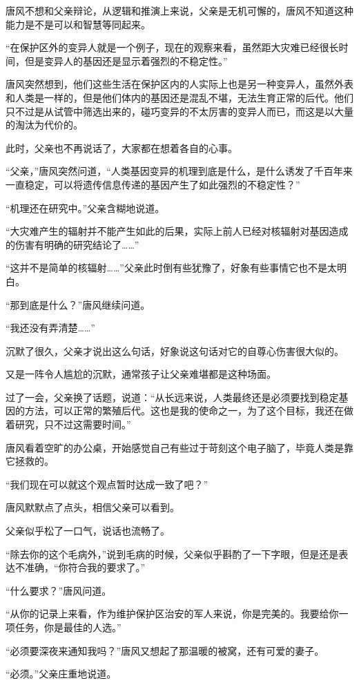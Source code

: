 唐风不想和父亲辩论，从逻辑和推演上来说，父亲是无机可懈的，唐风不知道这种能力是不是可以和智慧等同起来。

“在保护区外的变异人就是一个例子，现在的观察来看，虽然距大灾难已经很长时间，但是变异人的基因还是显示着强烈的不稳定性。”

唐风突然想到，他们这些生活在保护区内的人实际上也是另一种变异人，虽然外表和人类是一样的，但是他们体内的基因还是混乱不堪，无法生育正常的后代。他们只不过是从试管中筛选出来的，碰巧变异的不太厉害的变异人而已，而这是以大量的淘汰为代价的。

此时，父亲也不再说话了，大家都在想着各自的心事。

“父亲，”唐风突然问道，“人类基因变异的机理到底是什么，是什么诱发了千百年来一直稳定，可以将遗传信息传递的基因产生了如此强烈的不稳定性？”

“机理还在研究中。”父亲含糊地说道。

“大灾难产生的辐射并不能产生如此的后果，实际上前人已经对核辐射对基因造成的伤害有明确的研究结论了……”

“这并不是简单的核辐射……”父亲此时倒有些犹豫了，好象有些事情它也不是太明白。

“那到底是什么？”唐风继续问道。

“我还没有弄清楚……”

沉默了很久，父亲才说出这么句话，好象说这句话对它的自尊心伤害很大似的。

又是一阵令人尴尬的沉默，通常孩子让父亲难堪都是这种场面。

过了一会，父亲换了话题，说道：“从长远来说，人类最终还是必须要找到稳定基因的方法，可以正常的繁殖后代。这也是我的使命之一，为了这个目标，我还在做着研究，只不过这需要时间。”

唐风看着空旷的办公桌，开始感觉自己有些过于苛刻这个电子脑了，毕竟人类是靠它拯救的。

“我们现在可以就这个观点暂时达成一致了吧？”

唐风默默点了点头，相信父亲可以看到。

父亲似乎松了一口气，说话也流畅了。

“除去你的这个毛病外，”说到毛病的时候，父亲似乎斟酌了一下字眼，但是还是表达不准确，“你符合我的要求了。”

“什么要求？”唐风问道。

“从你的记录上来看，作为维护保护区治安的军人来说，你是完美的。我要给你一项任务，你是最佳的人选。”

“必须要深夜来通知我吗？”唐风又想起了那温暖的被窝，还有可爱的妻子。

“必须。”父亲庄重地说道。

